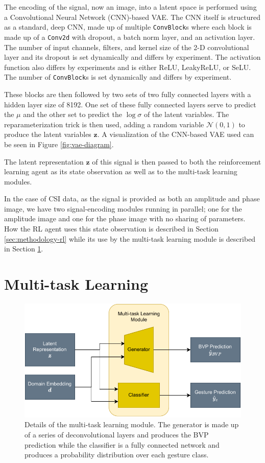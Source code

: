 The encoding of the signal, now an image, into a latent space is performed using a Convolutional Neural Network (CNN)-based VAE.
The CNN itself is structured as a standard, deep CNN, made up of multiple \verb|ConvBlock|s where each block is made up of a \verb|Conv2d| with dropout, a batch norm layer, and an activation layer.
The number of input channels, filters, and kernel size of the 2-D convolutional layer and its dropout is set dynamically and differs by experiment.
The activation function also differs by experiments and is either ReLU, LeakyReLU, or SeLU.
The number of \verb|ConvBlock|s is set dynamically and differs by experiment.

These blocks are then followed by two sets of two fully connected layers with a hidden layer size of 8192.
One set of these fully connected layers serve to predict the $\mu$ and the other set to predict the $\log \sigma$ of the latent variables.
The reparameterization trick is then used, adding a random variable $\mathcal{N}(0, 1)$ to produce the latent variables $\boldsymbol{z}$.
A visualization of the CNN-based VAE used can be seen in Figure \ref{fig:vae-diagram}.

The latent representation $\boldsymbol{z}$ of this signal is then passed to both the reinforcement learning agent as its state observation as well as to the multi-task learning modules.

In the case of CSI data, as the signal is provided as both an amplitude and phase image, we have two signal-encoding modules running in parallel; one for the amplitude image and one for the phase image with no sharing of parameters.
How the RL agent uses this state observation is described in Section \ref{sec:methodology-rl} while its use by the multi-task learning module is described in Section \ref{sec:methodology-multi-task-learning}.

\section{Multi-task Learning}\label{sec:methodology-multi-task-learning}

\begin{figure}
	\centering
	\includegraphics[width=0.8\linewidth]{figures/multitask_learning_module_diagram.pdf}
	\caption{Details of the multi-task learning module. The generator is made up of a series of deconvolutional layers and produces the BVP prediction while the classifier is a fully connected network and produces a probability distribution over each gesture class.}
	\label{fig:multitask-learning-module-diagram}
\end{figure}

